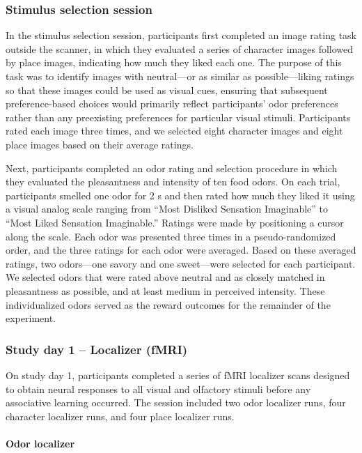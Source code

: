 \documentclass[12pt,letterpaper]{article}
\begin{document}
\subsubsection*{Stimulus selection session}

In the stimulus selection session, participants first completed an image rating task outside the scanner, in which they evaluated a series of character images followed by place images, indicating how much they liked each one. The purpose of this task was to identify images with neutral---or as similar as possible---liking ratings so that these images could be used as visual cues, ensuring that subsequent preference-based choices would primarily reflect participants' odor preferences rather than any preexisting preferences for particular visual stimuli. Participants rated each image three times, and we selected eight character images and eight place images based on their average ratings.


Next, participants completed an odor rating and selection procedure in which they evaluated the pleasantness and intensity of ten food odors. On each trial, participants smelled one odor for 2 s and then rated how much they liked it using a visual analog scale ranging from “Most Disliked Sensation Imaginable” to “Most Liked Sensation Imaginable.” Ratings were made by positioning a cursor along the scale. Each odor was presented three times in a pseudo-randomized order, and the three ratings for each odor were averaged. Based on these averaged ratings, two odors—one savory and one sweet—were selected for each participant. We selected odors that were rated above neutral and as closely matched in pleasantness as possible, and at least medium in perceived intensity. These individualized odors served as the reward outcomes for the remainder of the experiment.


\subsubsection*{Study day 1 – Localizer (fMRI)}

On study day 1, participants completed a series of fMRI localizer scans designed to obtain neural responses to all visual and olfactory stimuli before any associative learning occurred. The session included two odor localizer runs, four character localizer runs, and four place localizer runs. 


\paragraph*{Odor localizer}
\end{document}
